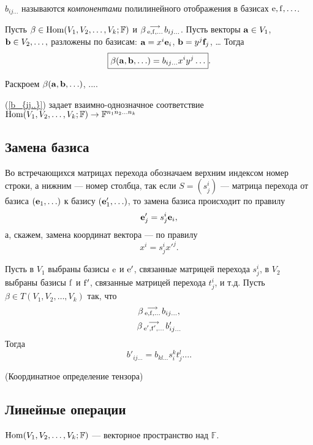 $b_{i j \ldots }$ называются {\it компонентами} полилинейного отображения в базисах $\mathrm{e}, \mathrm{f}, \ldots $. 

\begin{theor}\label{t20_1_1}
Пусть $\beta \in \mathop{\rm Hom}\nolimits(V_1, V_2, \ldots , V_k; \mathbb{F})$ и 
$\beta \begin{smallmatrix} \longrightarrow \\ \mathrm{e}, \mathrm{f}, \ldots  \end{smallmatrix} b_{i j \ldots }$. 
Пусть векторы $\mathbf{a} \in V_1$, $\mathbf{b} \in V_2, \ldots, $ разложены по базисам:
$\mathbf{a} = x^i \mathbf{e}_i $, $\mathbf{b} = y^j \mathbf{f}_j $, \ldots
Тогда 
\begin{equation}\label{beta()}
\boxed{ \beta (\mathbf{a}, \mathbf{b}, \ldots ) = b_{i j \ldots } x^iy^j\ldots } .
\end{equation}
\end{theor}
\dok Раскроем $\beta (\mathbf{a}, \mathbf{b}, \ldots)  $, ....
\edok

 (\ref{b_{ij..}}) задает взаимно-однозначное соответствие 
 $\mathop{\rm Hom}\nolimits(V_1, V_2, \ldots , V_k; \mathbb{F}) \to \mathbb{F} ^{n_1n_2\ldots n_k}$



\subsection{Замена базиса}
 

Во встречающихся матрицах перехода обозначаем верхним индексом номер строки, 
а нижним --- номер столбца, так если $S=(s^i_j)$ --- матрица перехода от базиса
$(\mathbf{e}_1, \ldots )$ к базису $(\mathbf{e}'_1, \ldots )$, то замена базиса
происходит по правилу $$\mathbf{e}'_j = s^i_j \mathbf{e}_i,$$
а, скажем, замена координат вектора --- 
по правилу $$x^i = s^i_j x'^j.$$


\begin{theor}\label{t20_1_2}
Пусть в $V_1$ выбраны базисы $\mathrm{e}$ и $\mathrm{e}'$, связанные матрицей перехода $s^i_j$, 
в $V_2$ выбраны базисы $\mathrm{f}$ и $\mathrm{f}'$, связанные матрицей перехода $t^i_j$, и т.д.
Пусть $\beta \in T(V_1, V_2, \ldots , V_k)$ так, что 
$$\beta \begin{smallmatrix} \longrightarrow \\ \mathrm{e}, \mathrm{f}, \ldots  \end{smallmatrix} b_{i j \ldots },$$ 
$$\beta \begin{smallmatrix} \longrightarrow \\ \mathrm{e}', \mathrm{f}', \ldots  \end{smallmatrix} b'_{i j \ldots }$$
Тогда  
\begin{equation}\label{zamena_tenz}
\boxed{b'_{i j \ldots }  = b_{k l \ldots } s^k_i t^l_j \ldots  }.
\end{equation}
\end{theor}

(Координатное определение тензора)


\subsection{Линейные операции}


$\mathop{\rm Hom}\nolimits(V_1, V_2, \ldots , V_k; \mathbb{F})$ --- векторное пространство над $\mathbb{F}$. 


